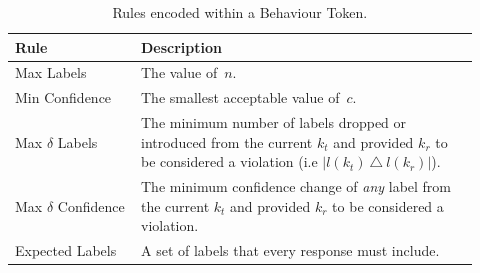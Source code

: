 \begin{table}[t]
    \centering
    \caption[Rules encoded within behaviour tokens]{Rules encoded within a Behaviour Token.}
    \label{tab:behaviour-token-rules}
    \small
    \begin{tabular}{p{0.25\linewidth}|p{0.675\linewidth}}
    \toprule
    \textbf{Rule} &
    \textbf{Description}\\
    \midrule
    Max Labels & The value of~$n$.\\
    Min Confidence & The smallest acceptable value of~$c$.\\
    Max $\delta$ Labels & The minimum number of labels dropped or introduced from the current $k_{t}$ and provided $k_{r}$ to be considered a violation (i.e $|l(k_{t})~\triangle~l(k_{r})|$).\\
    Max $\delta$ Confidence & The minimum confidence change of \textit{any} label from the current $k_{t}$ and provided $k_{r}$ to be considered a violation.\\
    Expected Labels & A set of labels that every response must include.\\
    \bottomrule
    \end{tabular}
\end{table}
